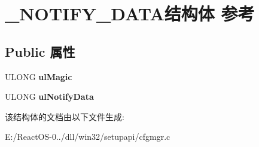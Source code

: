 \hypertarget{struct___n_o_t_i_f_y___d_a_t_a}{}\section{\+\_\+\+N\+O\+T\+I\+F\+Y\+\_\+\+D\+A\+T\+A结构体 参考}
\label{struct___n_o_t_i_f_y___d_a_t_a}
\subsection*{Public 属性}
\begin{DoxyCompactItemize}
\item 
\mbox{\label{struct___n_o_t_i_f_y___d_a_t_a_a114864433f8ae37aeb80d1377652e0a3}} 
U\+L\+O\+NG {\bfseries ul\+Magic}
\item 
\mbox{\label{struct___n_o_t_i_f_y___d_a_t_a_af33147bc7a904a5e60a56cd407023684}} 
U\+L\+O\+NG {\bfseries ul\+Notify\+Data}
\end{DoxyCompactItemize}


该结构体的文档由以下文件生成\+:\begin{DoxyCompactItemize}
\item 
E\+:/\+React\+O\+S-\/0../dll/win32/setupapi/cfgmgr.\+c\end{DoxyCompactItemize}
